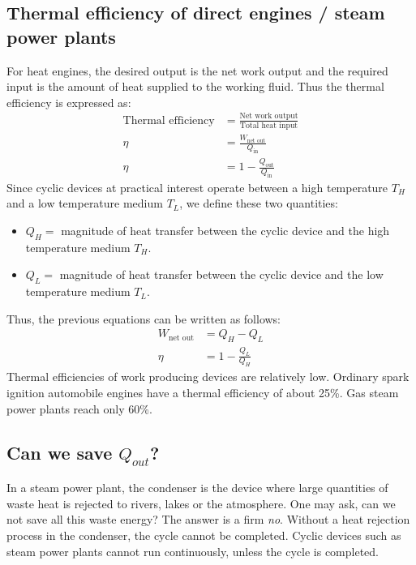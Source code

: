 \documentclass[class=report, crop=false, 12pt,a4paper]{standalone}
\begin{document}
\subsection{Thermal efficiency of direct engines / steam power plants}
For heat engines, the desired output is the net work output and the required input is the amount of heat supplied to the working fluid. Thus the thermal efficiency is expressed as:
\begin{align}
  \textrm{Thermal efficiency} &= \frac{\textrm{Net work output}}{\textrm{Total heat input}} \\
  \eta &= \frac{W_{\textrm{net out}}}{Q_{\textrm{in}}} \\
  \eta &= 1 - \frac{Q_{\textrm{out}}}{Q_{\textrm{in}}} 
\end{align}
Since cyclic devices at practical interest operate between a high temperature \(T_H\) and a low temperature medium \(T_L\), we define these two quantities:
\begin{itemize}
  \item {\(Q_H =\)} magnitude of heat transfer between the cyclic device and the high temperature medium \(T_H\).
  \item {\(Q_L =\)} magnitude of heat transfer between the cyclic device and the low temperature medium \(T_L\).
\end{itemize}
Thus, the previous equations can be written as follows:
\begin{align}
  W_{\textrm{net out}} &= Q_H - Q_L \\
  \eta &= 1 - \frac{Q_L}{Q_H} 
\end{align}
Thermal efficiencies of work producing devices are relatively low. Ordinary spark ignition automobile engines have a thermal efficiency of about 25\%. Gas steam power plants reach only 60\%.
\subsection{Can we save \(Q_{out}\)?}
In a steam power plant, the condenser is the device where large quantities of waste heat is rejected to rivers, lakes or the atmosphere. One may ask, can we not save all this waste energy? The answer is a firm \emph{no}. Without a heat rejection process in the condenser, the cycle cannot be completed. Cyclic devices such as steam power plants cannot run continuously, unless the cycle is completed.
\end{document}
